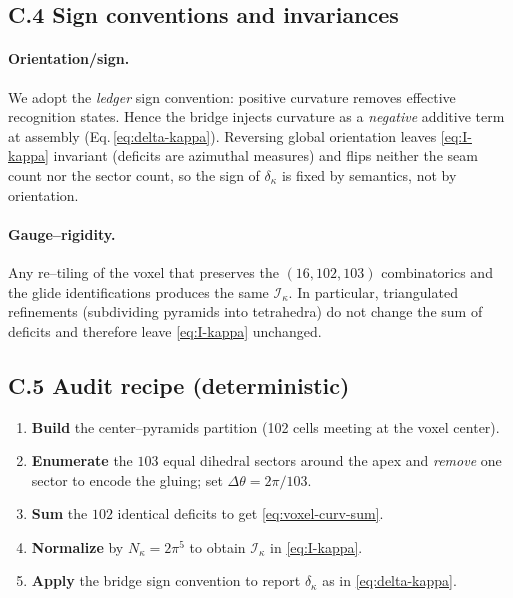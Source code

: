 \documentclass[11pt]{article}
\begin{document}
\begin{proposition}
\subsection*{C.4  Sign conventions and invariances}

\paragraph{Orientation/sign.}
We adopt the \emph{ledger} sign convention: positive curvature removes effective recognition states. Hence the bridge injects curvature as a \emph{negative} additive term at assembly (Eq.\,\eqref{eq:delta-kappa}). Reversing global orientation leaves \eqref{eq:I-kappa} invariant (deficits are azimuthal measures) and flips neither the seam count nor the sector count, so the sign of $\delta_{\kappa}$ is fixed by semantics, not by orientation.

\paragraph{Gauge–rigidity.}
Any re–tiling of the voxel that preserves the $(16,102,103)$ combinatorics and the glide identifications produces the same $\mathcal I_{\kappa}$. In particular, triangulated refinements (subdividing pyramids into tetrahedra) do not change the sum of deficits and therefore leave \eqref{eq:I-kappa} unchanged.%

\subsection*{C.5  Audit recipe (deterministic)}

\begin{enumerate}
  \item \textbf{Build} the center–pyramids partition (102 cells meeting at the voxel center).
  \item \textbf{Enumerate} the $103$ equal dihedral sectors around the apex and \emph{remove} one sector to encode the gluing; set $\Delta\theta=2\pi/103$.
  \item \textbf{Sum} the $102$ identical deficits to get \eqref{eq:voxel-curv-sum}.
  \item \textbf{Normalize} by $N_{\kappa}=2\pi^{5}$ to obtain $\mathcal I_{\kappa}$ in \eqref{eq:I-kappa}.
  \item \textbf{Apply} the bridge sign convention to report $\delta_{\kappa}$ as in \eqref{eq:delta-kappa}.%
\end{enumerate}


\end{proposition}
\end{document}
